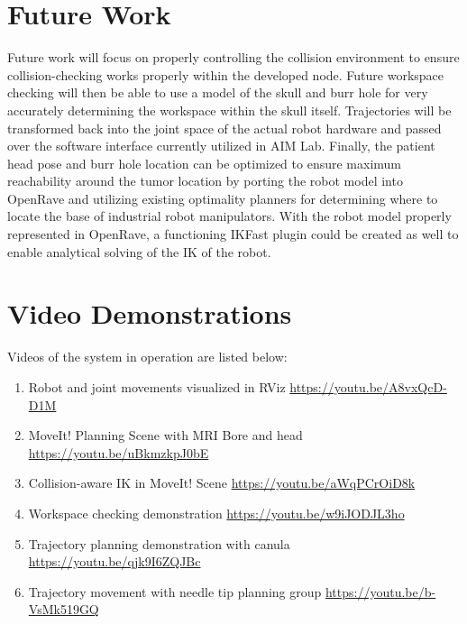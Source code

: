 \documentclass[12pt]{report}
\begin{document}
\chapter{Future Work}
Future work will focus on properly controlling the collision environment to ensure collision-checking works properly within the developed node. Future workspace checking will then be able to use a model of the skull and burr hole for very accurately determining the workspace within the skull itself. Trajectories will be transformed back into the joint space of the actual robot hardware and passed over the software interface currently utilized in AIM Lab. Finally, the patient head pose and burr hole location can be optimized to ensure maximum reachability around the tumor location by porting the robot model into OpenRave and utilizing existing optimality planners for determining where to locate the base of industrial robot manipulators. \cite{workspaceChecker} With the robot model properly represented in OpenRave, a functioning IKFast plugin could be created as well to enable analytical solving of the IK of the robot.


\appendix
\chapter{Video Demonstrations}
\label{sec:appendixVideos}
Videos of the system in operation are listed below:
\begin{enumerate}
\item Robot and joint movements visualized in RViz \url{https://youtu.be/A8vxQcD-D1M}
\item MoveIt! Planning Scene with MRI Bore and head \url{https://youtu.be/uBkmzkpJ0bE}
\item Collision-aware IK in MoveIt! Scene \url{https://youtu.be/aWqPCrOiD8k}
\item Workspace checking demonstration \url{https://youtu.be/w9iJODJL3ho}
\item Trajectory planning demonstration with canula \url{https://youtu.be/qjk9I6ZQJBc}
\item Trajectory movement with needle tip planning group \url{https://youtu.be/b-VsMk519GQ}
\end{enumerate}

\singlespacing

%
%
%
\end{document}
